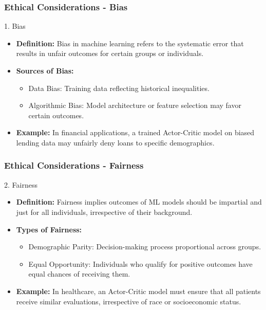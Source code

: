 \documentclass{beamer}
\begin{document}
\begin{frame}[fragile]
    \frametitle{Ethical Considerations - Bias}
    \begin{block}{1. Bias}
        \begin{itemize}
            \item {\bf Definition:} Bias in machine learning refers to the systematic error that results in unfair outcomes for certain groups or individuals.
            \item {\bf Sources of Bias:} 
                \begin{itemize}
                    \item Data Bias: Training data reflecting historical inequalities.
                    \item Algorithmic Bias: Model architecture or feature selection may favor certain outcomes.
                \end{itemize}
            \item {\bf Example:} In financial applications, a trained Actor-Critic model on biased lending data may unfairly deny loans to specific demographics.
        \end{itemize}
    \end{block}
\end{frame}

\begin{frame}[fragile]
    \frametitle{Ethical Considerations - Fairness}
    \begin{block}{2. Fairness}
        \begin{itemize}
            \item {\bf Definition:} Fairness implies outcomes of ML models should be impartial and just for all individuals, irrespective of their background.
            \item {\bf Types of Fairness:} 
                \begin{itemize}
                    \item Demographic Parity: Decision-making process proportional across groups.
                    \item Equal Opportunity: Individuals who qualify for positive outcomes have equal chances of receiving them.
                \end{itemize}
            \item {\bf Example:} In healthcare, an Actor-Critic model must ensure that all patients receive similar evaluations, irrespective of race or socioeconomic status.
        \end{itemize}
    \end{block}
\end{frame}
\end{document}
